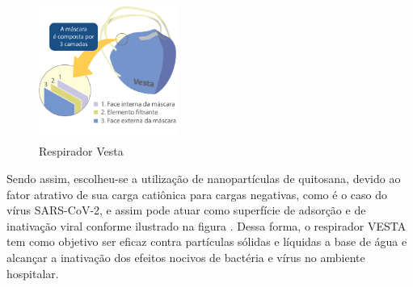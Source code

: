 \begin{figure}[H]
 \begin{center}
  \includegraphics[width=0.4\textwidth]{figuras/Vesta.png}
   \caption{{Respirador Vesta }}\label{fig:vesta}
  \end{center}
\end{figure}

Sendo assim, escolheu-se a utilização de nanopartículas de quitosana,  devido ao fator atrativo de sua carga catiônica para cargas negativas, como é o caso do vírus SARS-CoV-2, e assim pode atuar como superfície de adsorção e de inativação viral conforme ilustrado na figura  \cite{ciejka}. Dessa forma, o respirador VESTA tem como objetivo ser eficaz contra partículas sólidas e líquidas a base de água e alcançar a inativação dos efeitos nocivos de bactéria e vírus no ambiente hospitalar. 
